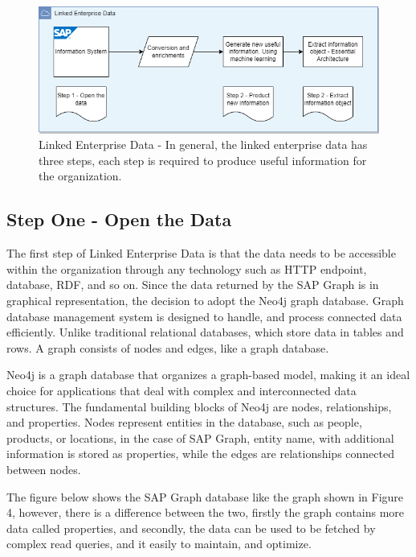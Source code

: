 \documentclass{article}
\begin{document}
\begin{figure}[ht!]
    \centering
    \includegraphics[scale=0.5]{linked-enterprise-data}
    \caption{Linked Enterprise Data - 
In general, the linked enterprise data has three steps, each step is required to produce useful information for the organization.
}
    \label{fig:LED}
\end{figure}

\maketitle
\subsection{Step One - Open the Data}

The first step of Linked Enterprise Data is that the data needs to be accessible within the organization through any technology such as HTTP endpoint, database, RDF, and so on. Since the data returned by the SAP Graph is in graphical representation, the decision to adopt the Neo4j graph database. Graph database management system is designed to handle, and process connected data efficiently. Unlike traditional relational databases, which store data in tables and rows. A graph consists of nodes and edges, like a graph database.

Neo4j is a graph database that organizes a graph-based model, making it an ideal choice for applications that deal with complex and interconnected data structures. The fundamental building blocks of Neo4j are nodes, relationships, and properties. Nodes represent entities in the database, such as people, products, or locations, in the case of SAP Graph, entity name, with additional information is stored as properties, while the edges are relationships connected between nodes. \parencite{miller2013}

The figure below shows the SAP Graph database like the graph shown in Figure 4, however, there is a difference between the two, firstly the graph contains more data called properties, and secondly, the data can be used to be fetched by complex read queries, and it easily to maintain, and optimize. 
\end{document}
